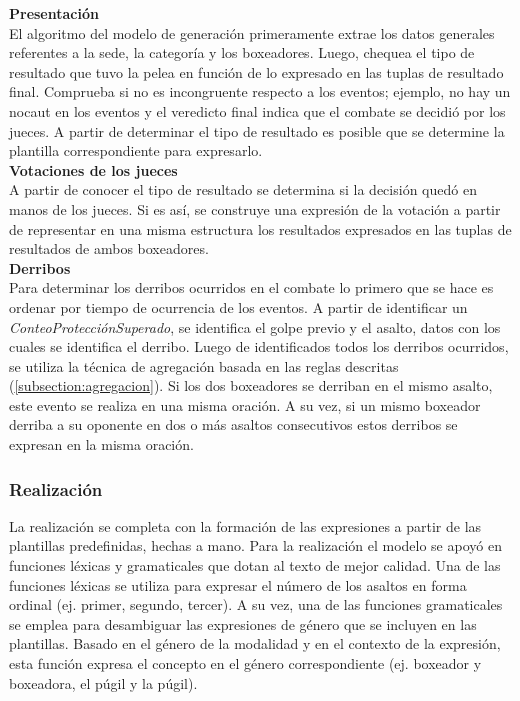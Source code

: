     \textbf{Presentación}\\

    El algoritmo del modelo de generación primeramente extrae los datos generales referentes a la sede, la categoría y los 
boxeadores. Luego, chequea el tipo de resultado que tuvo la pelea en función de lo expresado en las tuplas de resultado final.
Comprueba si no es incongruente respecto a los eventos; ejemplo, no hay un nocaut en los eventos y el veredicto final indica que el 
combate se decidió por los jueces. A partir de determinar el tipo de resultado es posible que se determine la plantilla correspondiente para 
expresarlo.\\

    \textbf{Votaciones de los jueces}\\

    A partir de conocer el tipo de resultado se determina si la decisión quedó en manos de los jueces. Si es así, se construye una expresión 
de la votación a partir de representar en una misma estructura los resultados expresados en las tuplas de resultados de 
ambos boxeadores.\\

    \textbf{Derribos}\\

    Para determinar los derribos ocurridos en el combate lo primero que se hace es ordenar por tiempo de 
ocurrencia de los eventos. A partir de identificar un \textit{ConteoProtecciónSuperado}, se identifica el golpe previo y el asalto, 
datos con los cuales se identifica el derribo. Luego de identificados todos los derribos ocurridos, se utiliza la técnica de agregación 
basada en las reglas descritas (\ref{subsection:agregacion}). Si los dos boxeadores se derriban en el mismo asalto, este evento se realiza en 
una misma oración. A su vez, si un mismo boxeador derriba a su oponente en dos o más asaltos consecutivos estos derribos se expresan en la misma 
oración.


\subsubsection{Realización}

    La realización se completa con la formación de las expresiones a partir de las plantillas predefinidas, hechas a mano. Para la 
realización el modelo se apoyó en funciones léxicas y gramaticales que dotan al texto de mejor calidad. Una de las funciones léxicas se utiliza 
para expresar el número de los asaltos en forma ordinal (ej. primer, segundo, tercer). A su vez, una de las funciones gramaticales se emplea para
desambiguar las expresiones de género que se incluyen en las plantillas. Basado en el género de la modalidad y en el contexto de la expresión, esta función expresa el concepto 
en el género correspondiente (ej. boxeador y boxeadora, el púgil y la púgil). 

